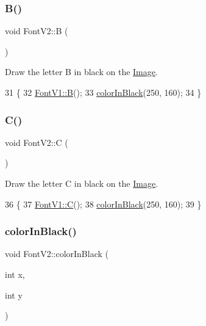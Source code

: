 \subsubsection{\texorpdfstring{B()}{B()}}
{\footnotesize\ttfamily void Font\+V2\+::B (\begin{DoxyParamCaption}{ }\end{DoxyParamCaption})}



Draw the letter B in black on the \mbox{\hyperlink{class_image}{Image}}. 


\begin{DoxyCode}
31                \{
32     \mbox{\hyperlink{class_font_v1_a620ee7876d479807f73481f27be48f2a}{FontV1::B}}();
33     \mbox{\hyperlink{class_font_v2_a04f2501961bc286ce70fbb6a840b0e8a}{colorInBlack}}(250, 160);
34 \}
\end{DoxyCode}
\mbox{\label{class_font_v2_ab7dc3a07d1442bd391513c4c202f2a43}} 
\subsubsection{\texorpdfstring{C()}{C()}}
{\footnotesize\ttfamily void Font\+V2\+::C (\begin{DoxyParamCaption}{ }\end{DoxyParamCaption})}



Draw the letter C in black on the \mbox{\hyperlink{class_image}{Image}}. 


\begin{DoxyCode}
36                \{
37     \mbox{\hyperlink{class_font_v1_a80602716ae6907fa518fbb50eeda2515}{FontV1::C}}();
38     \mbox{\hyperlink{class_font_v2_a04f2501961bc286ce70fbb6a840b0e8a}{colorInBlack}}(250, 160);
39 \}
\end{DoxyCode}
\mbox{\label{class_font_v2_a04f2501961bc286ce70fbb6a840b0e8a}} 
\subsubsection{\texorpdfstring{color\+In\+Black()}{colorInBlack()}}
{\footnotesize\ttfamily void Font\+V2\+::color\+In\+Black (\begin{DoxyParamCaption}\item[{int}]{x,  }\item[{int}]{y }\end{DoxyParamCaption})}




